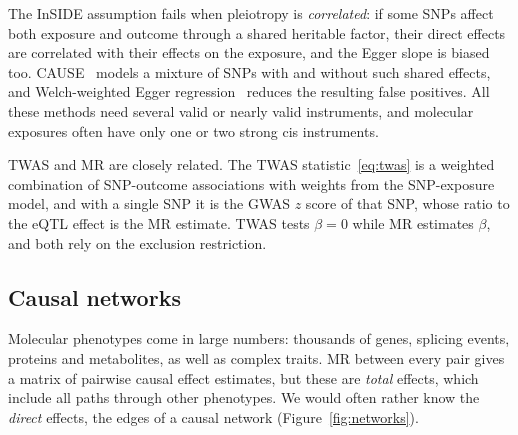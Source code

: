The InSIDE assumption fails when pleiotropy is \emph{correlated}: if some SNPs affect both exposure and outcome through a shared heritable factor, their direct effects are correlated with their effects on the exposure, and the Egger slope is biased too. CAUSE~\citep{morrison2020} models a mixture of SNPs with and without such shared effects, and Welch-weighted Egger regression~\citep{brown2021welch} reduces the resulting false positives. All these methods need several valid or nearly valid instruments, and molecular exposures often have only one or two strong cis instruments.

TWAS and MR are closely related. The TWAS statistic~\eqref{eq:twas} is a weighted combination of SNP-outcome associations with weights from the SNP-exposure model, and with a single SNP it is the GWAS $z$ score of that SNP, whose ratio to the eQTL effect is the MR estimate. TWAS tests $\beta=0$ while MR estimates $\beta$, and both rely on the exclusion restriction.

\subsection{Causal networks}

Molecular phenotypes come in large numbers: thousands of genes, splicing events, proteins and metabolites, as well as complex traits. MR between every pair gives a matrix of pairwise causal effect estimates, but these are \emph{total} effects, which include all paths through other phenotypes. We would often rather know the \emph{direct} effects, the edges of a causal network (Figure~\ref{fig:networks}).

